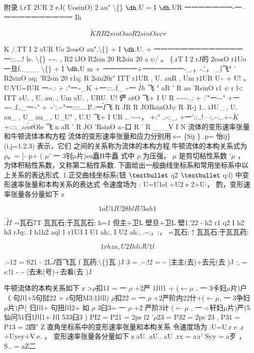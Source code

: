 附录 l.rT 2UR 2 ${\rm e}$J( UosinO) 2 au" \textbackslash\{\} ${\rm ð}$.U = I ${\rm ð}$.UR 一一一一一一一-一--一一一一一一一一一一 Ih

\[  ~\tilde{K} R R 2sinO ao R2sinO a \psi  r\]

K /.TT I 2 aUR Uo 2cosO au",\textbackslash\{\} + I ${\rm ð}$.U. + 一一一一一一一一一一一一一一::....! le. \textbackslash\{\} \textasciitilde{}\textasciitilde{}. , R2 iJO R2sin 20 R2sin 20 a $\psi$/ 。 \{.rT I 2 rJ的 2cosO r1Uo 一旦f..\_\_\_ \textbackslash\{\} + I ${\rm ð}$.U m + 一一一一一+一一一一一一-\_.，-.'.， \_l飞" ' R2sinO aq; 'R2sin 20 r1q; R 2sin20r" ITT r1UR , U. auR , Um r1UR U\textasciitilde{} + U! 、U.VU=IUR 一\textasciitilde{}.: + :"一\textasciitilde{}\_K +一:::..f\_ \textasciitilde{}一 $\tilde{Ih}$ 飞 " aR ' R ao 'RsinO r1 $\psi$ r l< ITT aU. , U. au. , Um aU. , URU. U! 俨 otO 飞+ I U R \textasciitilde{}\textasciitilde{}\textasciitilde{}..: + :'"一\textasciitilde{}-" +一=-..f..\_一\textasciitilde{}" + \textasciitilde{}':.\textasciitilde{}"一::::....I!.:一$\tilde{I}$飞 R JR R JORsinOJ$\psi$ R--R-j 1.. iJU\_ , U. au\_ , U\_ au\_ , U\_U" , U.U 飞+ I UR .. \textasciitilde{}-\textasciitilde{}， +:" ..-:\_, +一'::..!---;.\textasciitilde{}:..+\textasciitilde{}$\tilde{K}$+::::\_$\iota$$\tilde{cot}$Ole 飞 n aR ' R JO 'RsinO a\textasciitilde{}口 R ' R \_\_\_V I N 流体的变形速率张量和牛顿流体本构方程 流体的变形速率张量和应力分别用 s= \{Sij \} .p= 怡ij\}(i.j=1.2.3) 表示，它们 之间的关系称为流体的本构方程.牛顿流体的本构关系式为 $\rho$。= [- p+ ( $\mu$' 一 3钊$\mu$片)su矗H牛矗 式中 $\rho$ 为压强， $\mu$ 是剪切粘性系数 '$\mu$ ，为体积粘性系数，又称第二粘性系数. 下面给出一般曲线坐标系和常用坐标系中以上关系的表达形式. 1.正交曲线坐标系(钮 ${\rm •}$ q2 ${\rm •}$ q:l) 中变形速率张量和本构关系的表达式 令速度场为 : U=U1el +U2 e 2+U:， 酌，变形速率张量各分量如下 z

\[1 aU1 I U2 \theta  h l I U3 ah 1\]

.$\tilde{II}$ =瓦石7T 瓦瓦石;于瓦瓦石; h=1 但主+卫L 壁旦+卫L 壁1.'22 - h2 r1 q2 I h2 h3 rJq:. I h1h2 aql 1 r1U3 I U1 ah:, I U2 ah:, .\textasciitilde{}:，:， =瓦石;$\uparrow$瓦瓦石:于瓦瓦药;

\[1 rh z a ,U2   I hl iJ U 1   l\]

.\textasciitilde{}12 = S21 - 2L$\tilde{J}$百飞瓦 f 瓦药;\textbackslash\{\}瓦 )J 3 = .\textasciitilde{}:!2 = \textasciitilde{} [主主(去)+去元(去 )J :, = s:!1 - \textasciitilde{} [去未(号)+去看(去 )J

牛顿流体的本构关系如下 z >$\rho$扣11 = 一 $\rho$ +2严 1川1 + ($\leftarrow$$\mu$ , 一 3卡妇$\mu$片)户〈 句川+5句挝22 + s句阳M3:1川l) $\rho$扣22 = 一 $\rho$ +2严阶内22什+($\leftarrow$$\mu$, 一 3争妇$\mu$片)户( 归川+ 句扭川2+ 如 $\rho$ 3臼3= 一 $\rho$ +2 严阶3计 ($\leftarrow$$\mu$ , 一 $\div$轩妇$\mu$片)严(5仙问51归1川1+ 川 533臼3 ) PI2 = P21 = 2ps l2 '$\rho$23 = P32 = 2ps 23 , P31 = P13 = 2四" Z 直角坐标系中的变形速率张量和本构关系 令速度场为 :U=U.r e .r +Uyey+V.e. ， 变形速率张量各分量如下 z aU. aU.. aU .rx = a:r' Syy = a歹 ， S.. = aZ二


